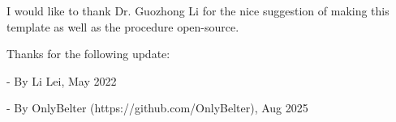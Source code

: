 I would like to thank Dr. Guozhong Li for the nice suggestion of making this template as well as the procedure open-source.

Thanks for the following update:

- By Li Lei, May 2022

- By OnlyBelter (https://github.com/OnlyBelter), Aug 2025
